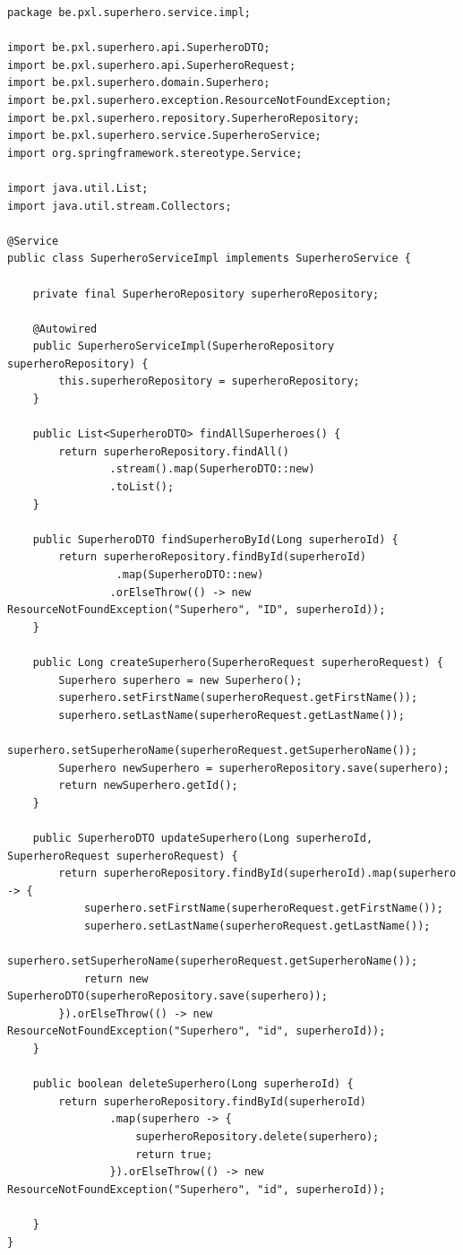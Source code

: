 \begin{lstlisting}[frame=single]
package be.pxl.superhero.service.impl;

import be.pxl.superhero.api.SuperheroDTO;
import be.pxl.superhero.api.SuperheroRequest;
import be.pxl.superhero.domain.Superhero;
import be.pxl.superhero.exception.ResourceNotFoundException;
import be.pxl.superhero.repository.SuperheroRepository;
import be.pxl.superhero.service.SuperheroService;
import org.springframework.stereotype.Service;

import java.util.List;
import java.util.stream.Collectors;

@Service
public class SuperheroServiceImpl implements SuperheroService {

	private final SuperheroRepository superheroRepository;

	@Autowired
	public SuperheroServiceImpl(SuperheroRepository superheroRepository) {
		this.superheroRepository = superheroRepository;
	}

	public List<SuperheroDTO> findAllSuperheroes() {
		return superheroRepository.findAll()
				.stream().map(SuperheroDTO::new)
				.toList();
	}

	public SuperheroDTO findSuperheroById(Long superheroId) {
		return superheroRepository.findById(superheroId)
		         .map(SuperheroDTO::new)
				.orElseThrow(() -> new ResourceNotFoundException("Superhero", "ID", superheroId));
	}

	public Long createSuperhero(SuperheroRequest superheroRequest) {
		Superhero superhero = new Superhero();
		superhero.setFirstName(superheroRequest.getFirstName());
		superhero.setLastName(superheroRequest.getLastName());
		superhero.setSuperheroName(superheroRequest.getSuperheroName());
		Superhero newSuperhero = superheroRepository.save(superhero);
		return newSuperhero.getId();
	}

	public SuperheroDTO updateSuperhero(Long superheroId, SuperheroRequest superheroRequest) {
		return superheroRepository.findById(superheroId).map(superhero -> {
			superhero.setFirstName(superheroRequest.getFirstName());
			superhero.setLastName(superheroRequest.getLastName());
			superhero.setSuperheroName(superheroRequest.getSuperheroName());
			return new SuperheroDTO(superheroRepository.save(superhero));
		}).orElseThrow(() -> new ResourceNotFoundException("Superhero", "id", superheroId));
	}

	public boolean deleteSuperhero(Long superheroId) {
		return superheroRepository.findById(superheroId)
				.map(superhero -> {
					superheroRepository.delete(superhero);
					return true;
				}).orElseThrow(() -> new ResourceNotFoundException("Superhero", "id", superheroId));

	}
}
\end{lstlisting}

